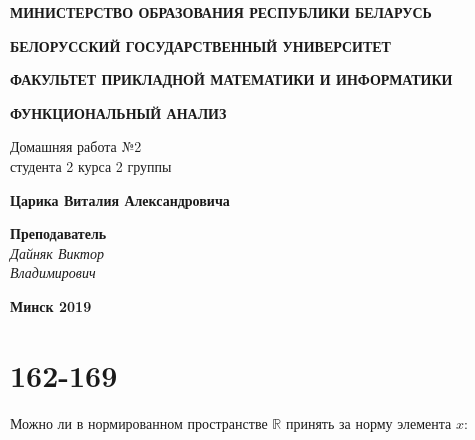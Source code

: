 \documentclass[oneside, final, 11pt]{article}
\begin{document}
\begin{titlepage}
	
	
	
	\centerline{\large \bf МИНИСТЕРСТВО ОБРАЗОВАНИЯ РЕСПУБЛИКИ БЕЛАРУСЬ}
	\bigskip
	\bigskip
	\centerline{\large \bf БЕЛОРУССКИЙ ГОСУДАРСТВЕННЫЙ УНИВЕРСИТЕТ}
	\bigskip
	\bigskip
	\centerline{\large \bf ФАКУЛЬТЕТ ПРИКЛАДНОЙ МАТЕМАТИКИ И ИНФОРМАТИКИ}
	\vfill
	\vfill
	\vfill
	\centerline{\Large \bf ФУНКЦИОНАЛЬНЫЙ АНАЛИЗ}
	\bigskip
	\bigskip
	\vfill
	\begin{centering}
		{\large
			Домашняя работа №2\\
			студента 2 курса 2 группы \\}
	\end{centering}
	\centerline{\large \bf Царика Виталия Александровича}
	\vfill
	\vfill
	\hfill
	\begin{minipage}{0.25\textwidth}
		{\large{\bf Преподаватель} \\
			{\it Дайняк Виктор \\ Владимирович}}
	\end{minipage}
	\vfill
	\vfill
	\centerline{\Large \bf Минск 2019}
	
\end{titlepage}

\restoregeometry
\section{162-169}
	Можно ли в нормированном пространстве $\mathbb{R}$ принять за норму элемента $x$:
\end{document}
